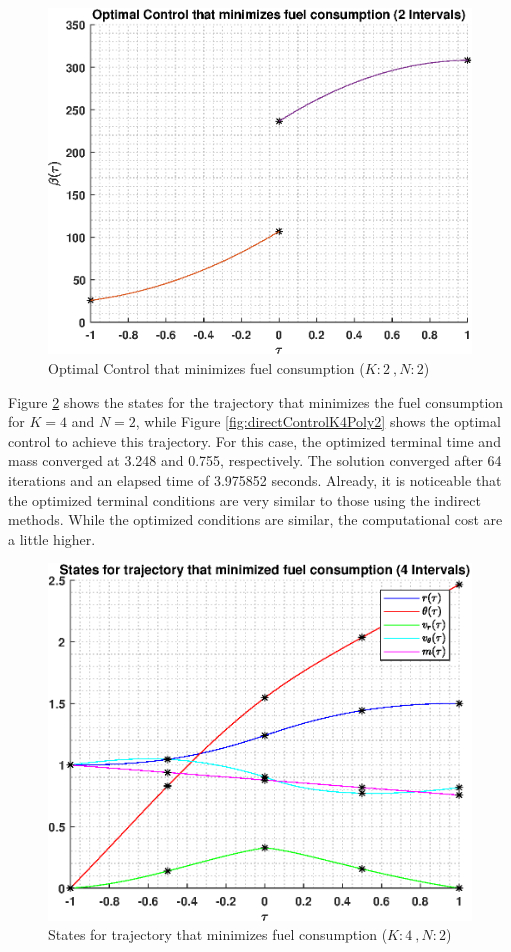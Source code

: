 \documentclass[]{article}
\begin{document}
\begin{figure}
	\centering
	\includegraphics[scale=0.75]{directControlK2Poly2.eps}
	\caption{Optimal Control that minimizes fuel consumption (\(K:2\ , N:2\))}
	\label{fig:directControlK2Poly2}
\end{figure}
\vspace{2mm}\newline 
Figure \ref{fig:directStatesK4Poly2} shows the states for the trajectory that minimizes the fuel consumption for \(K = 4\) and  \(N = 2\), while Figure \ref{fig:directControlK4Poly2} shows the optimal control to achieve this trajectory. For this case, the optimized terminal time and mass converged at 3.248 and  0.755, respectively. The solution converged after 64 iterations and an elapsed time of 3.975852 seconds. Already, it is noticeable that the optimized terminal conditions are very similar to those using the indirect methods. While the optimized conditions are similar, the computational cost are a little higher.
\begin{figure}
	\centering
	\includegraphics[scale=0.75]{directStatesK4Poly2.eps}
	\caption{States for trajectory that minimizes fuel consumption (\(K:4\ , N:2\))}
	\label{fig:directStatesK4Poly2}
\end{figure}
\end{document}
